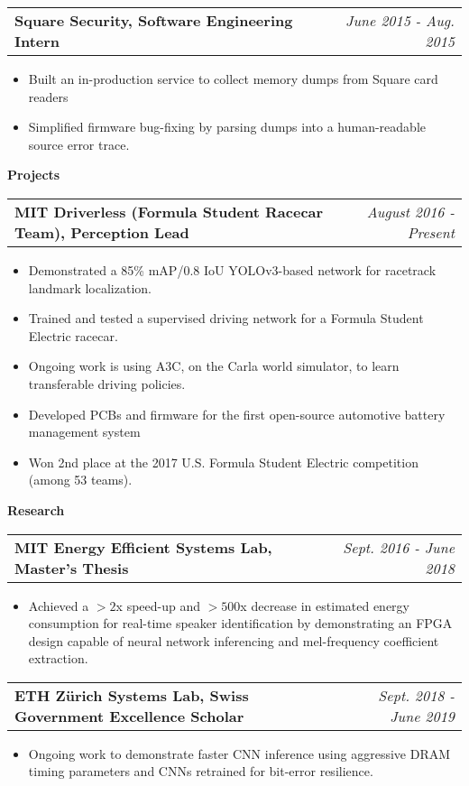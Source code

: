 \documentclass[letterpaper,11pt]{article}
\makeatletter
\newcommand{\resitem}[1]{\item[--] #1 \vspace{-4pt}}
\newcommand{\ressubheadingtwo}[2] {
\begin{tabular*}{7in}{l@{\extracolsep{\fill}}r}
	\textbf{#1} & \textit{#2} \\
\end{tabular*}\vspace{-6pt}}
\makeatother
\begin{document}
	\ressubheadingtwo{Square Security, Software Engineering Intern}{June 2015 - Aug. 2015}
	\begin{itemize}
            \itemsep0em
            \resitem{Built an in-production service to collect memory dumps from Square card readers}
            \resitem{Simplified firmware bug-fixing by parsing dumps into a human-readable source error trace.}
	\end{itemize}
    \vspace{0.05in}

\large \textbf{Projects\vspace{1mm}} \normalsize

    \ressubheadingtwo{MIT Driverless (Formula Student Racecar Team), Perception Lead}{August 2016 - Present}
    \begin{itemize}
        \itemsep0em
        \resitem{Demonstrated a 85\% mAP/0.8 IoU YOLOv3-based network for racetrack landmark localization.}
        \resitem{Trained and tested a supervised driving network for a Formula Student Electric racecar.}
        \resitem{Ongoing work is using A3C, on the Carla world simulator, to learn transferable driving policies.}
        \resitem{Developed PCBs and firmware for the first open-source automotive battery management system}
        \resitem{Won 2nd place at the 2017 U.S. Formula Student Electric competition (among 53 teams).}
    \end{itemize}

\large \textbf{Research \vspace{1mm}} \normalsize
    \vspace{0.04in}

	\ressubheadingtwo{MIT Energy Efficient Systems Lab, Master's Thesis}{Sept. 2016 - June 2018}{}
	\begin{itemize}
            \itemsep0em
            \resitem{Achieved a $>2$x speed-up and $>500$x decrease in estimated energy consumption for real-time speaker identification by demonstrating an FPGA design capable of neural network inferencing and mel-frequency coefficient extraction.}
	\end{itemize}

    \ressubheadingtwo{ETH Z{\"u}rich Systems Lab, Swiss Government Excellence Scholar}{Sept. 2018 - June 2019}{}
	\begin{itemize}
            \itemsep0em
            \resitem{Ongoing work to demonstrate faster CNN inference using aggressive DRAM timing parameters and CNNs retrained for bit-error resilience.}
	\end{itemize}
\end{document}
